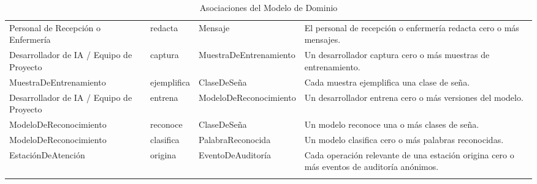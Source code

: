 \begin{longtable}{p{3.4cm} p{3.6cm} p{3.4cm} p{3.6cm}}
    Personal de Recepción o Enfermería & redacta & Mensaje & El personal de recepción o enfermería redacta cero o más mensajes. \\
    Desarrollador de IA / Equipo de Proyecto & captura & Muestra\-De\-Entrenamiento & Un desarrollador captura cero o más muestras de entrenamiento. \\
    Muestra\-De\-Entrenamiento & ejemplifica & Clase\-De\-Seña & Cada muestra ejemplifica una clase de seña. \\
    Desarrollador de IA / Equipo de Proyecto & entrena & Modelo\-De\-Reconocimiento & Un desarrollador entrena cero o más versiones del modelo. \\
    Modelo\-De\-Reconocimiento & reconoce & Clase\-De\-Seña & Un modelo reconoce una o más clases de seña. \\
    Modelo\-De\-Reconocimiento & clasifica & Palabra\-Reconocida & Un modelo clasifica cero o más palabras reconocidas. \\
    Estación\-De\-Atención & origina & Evento\-De\-Auditoría & Cada operación relevante de una estación origina cero o más eventos de auditoría anónimos. \\
    \bottomrule
    \caption{Asociaciones del Modelo de Dominio}
    \label{tab:asociaciones-dominio}
\end{longtable}
